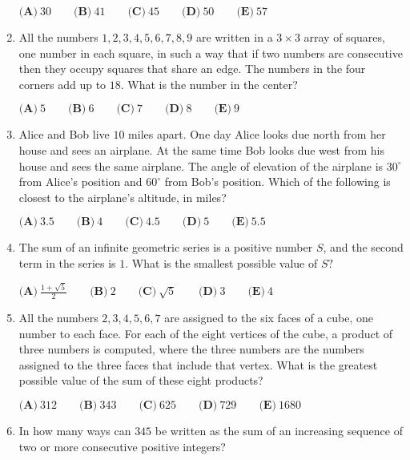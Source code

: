 \documentclass{article}
\begin{document}
\begin{enumerate}[label=\arabic*., itemsep=0.5em]
$\textbf{(A)}\ 30 \qquad
\textbf{(B)}\ 41 \qquad
\textbf{(C)}\ 45 \qquad
\textbf{(D)}\ 50 \qquad
\textbf{(E)}\ 57$\par \vspace{0.5em}\item All the numbers $1, 2, 3, 4, 5, 6, 7, 8, 9$ are written in a $3\times3$ array of squares, one number in each square, in such a way that if two numbers are consecutive then they occupy squares that share an edge. The numbers in the four corners add up to $18$. What is the number in the center?

$\textbf{(A)}\ 5\qquad\textbf{(B)}\ 6\qquad\textbf{(C)}\ 7\qquad\textbf{(D)}\ 8\qquad\textbf{(E)}\ 9$\par \vspace{0.5em}\item Alice and Bob live $10$ miles apart. One day Alice looks due north from her house and sees an airplane. At the same time Bob looks due west from his house and sees the same airplane. The angle of elevation of the airplane is $30^\circ$ from Alice's position and $60^\circ$ from Bob's position. Which of the following is closest to the airplane's altitude, in miles?

$\textbf{(A)}\ 3.5 \qquad\textbf{(B)}\ 4 \qquad\textbf{(C)}\ 4.5 \qquad\textbf{(D)}\ 5 \qquad\textbf{(E)}\ 5.5$\par \vspace{0.5em}\item The sum of an infinite geometric series is a positive number $S$, and the second term in the series is $1$. What is the smallest possible value of $S?$

$\textbf{(A)}\ \frac{1+\sqrt{5}}{2} \qquad
\textbf{(B)}\ 2 \qquad
\textbf{(C)}\ \sqrt{5} \qquad
\textbf{(D)}\ 3 \qquad
\textbf{(E)}\ 4$\par \vspace{0.5em}\item All the numbers $2, 3, 4, 5, 6, 7$ are assigned to the six faces of a cube, one number to each face. For each of the eight vertices of the cube, a product of three numbers is computed, where the three numbers are the numbers assigned to the three faces that include that vertex. What is the greatest possible value of the sum of these eight products?

$\textbf{(A)}\ 312 \qquad
\textbf{(B)}\ 343 \qquad
\textbf{(C)}\ 625 \qquad
\textbf{(D)}\ 729 \qquad
\textbf{(E)}\ 1680$\par \vspace{0.5em}\item In how many ways can $345$ be written as the sum of an increasing sequence of two or more consecutive positive integers?


\end{enumerate}
\end{document}
